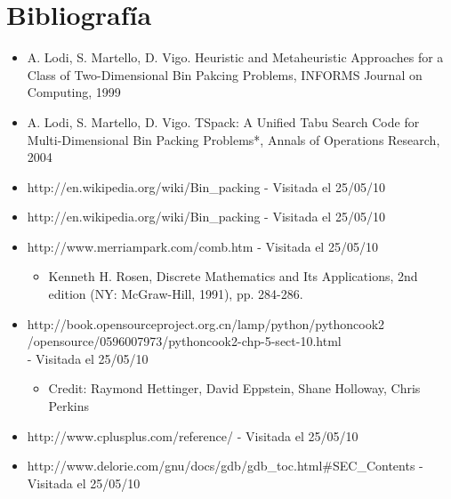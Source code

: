 \documentclass[a4paper,10pt]{article}
\begin{document}
\section{Bibliograf\'ia}
\begin{itemize}
 \item A. Lodi, S. Martello, D. Vigo. Heuristic and Metaheuristic
       Approaches for a Class of Two-Dimensional Bin Pakcing Problems, INFORMS Journal on Computing, 1999
 \item A. Lodi, S. Martello, D. Vigo. TSpack: A Unified Tabu Search Code
       for Multi-Dimensional Bin Packing Problems*, Annals of Operations
       Research, 2004
 \item http://en.wikipedia.org/wiki/Bin\_packing - Visitada el 25/05/10
 \item http://en.wikipedia.org/wiki/Bin\_packing - Visitada el 25/05/10
 \item http://www.merriampark.com/comb.htm - Visitada el 25/05/10
       \begin{itemize}
	\item Kenneth H. Rosen, Discrete Mathematics and Its Applications, 2nd edition (NY: McGraw-Hill, 1991), pp. 284-286.
       \end{itemize}
 \item http://book.opensourceproject.org.cn/lamp/python/pythoncook2\\/opensource/0596007973/pythoncook2-chp-5-sect-10.html
      \\- Visitada el 25/05/10
       \begin{itemize}
	\item Credit: Raymond Hettinger, David Eppstein, Shane Holloway, Chris Perkins
       \end{itemize}
 \item http://www.cplusplus.com/reference/ - Visitada el 25/05/10
 \item http://www.delorie.com/gnu/docs/gdb/gdb\_toc.html\#SEC\_Contents - Visitada el 25/05/10
\end{itemize}
\end{document}
